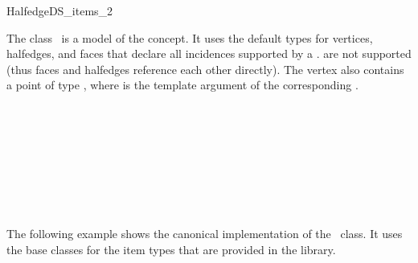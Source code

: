 
\ccRefPageBegin



\begin{ccRefClass}{HalfedgeDS_items_2}
\label{pageHalfedgeDSitemsRef}

\ccDefinition
  
The class \ccRefName\ is a model of the  concept.
It uses the default types for vertices, halfedges, and faces that
declare all incidences supported by a .
{\XHDS {} are not supported 
(thus faces and halfedges reference each other directly)}. 
The vertex also contains a point of type , 
where  is the template argument of the corresponding .


\ccIsModel


\ccSeeAlso

\\
\\
\\
\\
\\
\\
\\

\ccExample

The following example shows the canonical implementation of the
\ccRefName\ class. It uses the base classes for the item types that
are provided in the library.


\end{ccRefClass}
